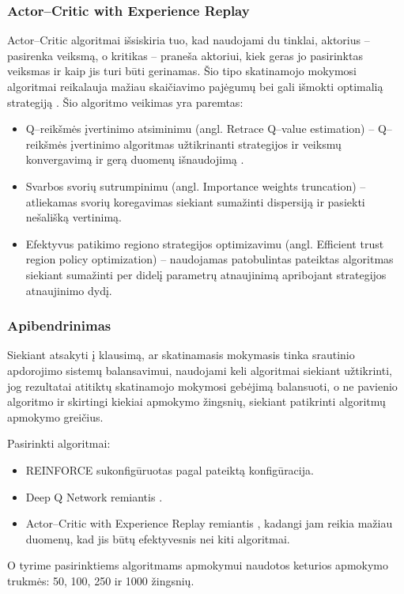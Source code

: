 \documentclass{VUMIFPSbakalaurinis}
\begin{document}
\subsubsection{Actor–Critic with Experience Replay}

Actor–Critic algoritmai išsiskiria tuo, kad naudojami du tinklai, aktorius – pasirenka veiksmą, o kritikas – praneša aktoriui, kiek geras jo pasirinktas veiksmas ir kaip jis turi būti gerinamas. Šio tipo skatinamojo mokymosi algoritmai reikalauja mažiau skaičiavimo pajėgumų bei gali išmokti optimalią strategiją \cite{sutton2018reinforcement}.
Šio algoritmo veikimas yra paremtas:
\begin{itemize}
    \item Q–reikšmės įvertinimo atsiminimu (angl. Retrace Q–value estimation) – Q–reikšmės įvertinimo algoritmas užtikrinanti strategijos ir veiksmų konvergavimą ir gerą duomenų išnaudojimą \cite{munos2016safe}.
    \item Svarbos svorių sutrumpinimu (angl. Importance weights truncation) – atliekamas svorių koregavimas siekiant sumažinti dispersiją ir pasiekti nešališką vertinimą.
    \item Efektyvus patikimo regiono strategijos optimizavimu (angl. Efficient trust region policy optimization) – naudojamas patobulintas \cite{schulman2015trust} pateiktas algoritmas siekiant sumažinti per didelį parametrų atnaujinimą apribojant strategijos atnaujinimo dydį.
\end{itemize}

\subsubsection{Apibendrinimas}

Siekiant atsakyti į klausimą, ar skatinamasis mokymasis tinka srautinio apdorojimo sistemų balansavimui, naudojami keli algoritmai siekiant užtikrinti, jog rezultatai atitiktų skatinamojo mokymosi gebėjimą balansuoti, o ne pavienio algoritmo ir skirtingi kiekiai apmokymo žingsnių, siekiant patikrinti algoritmų apmokymo greičius. 

Pasirinkti algoritmai: 
\begin{itemize}
    \item REINFORCE \cite{williams1992simple} sukonfigūruotas pagal \cite{vaquero2018autotuning} pateiktą konfigūracija.
    \item Deep Q Network remiantis \cite{mnih2015human}.
    \item Actor–Critic with Experience Replay remiantis \cite{wang2016sample}, kadangi jam reikia mažiau duomenų, kad jis būtų efektyvesnis nei kiti algoritmai.
\end{itemize}
O tyrime pasirinktiems algoritmams apmokymui naudotos keturios apmokymo trukmės: 50, 100, 250 ir 1000 žingsnių.
\end{document}
